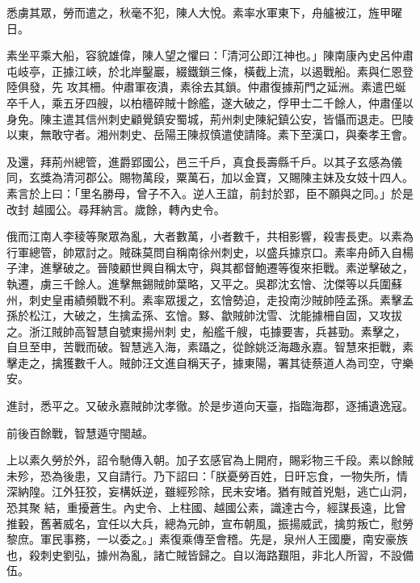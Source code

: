 \begin{pinyinscope}
 悉虜其眾，勞而遣之，秋毫不犯，陳人大悅。素率水軍東下，舟艫被江，旌甲曜日。



 素坐平乘大船，容貌雄偉，陳人望之懼曰：「清河公即江神也。」陳南康內史呂仲肅屯岐亭，正據江峽，於北岸鑿巖，綴鐵鎖三條，橫截上流，以遏戰船。素與仁恩登陸俱發，先
 攻其柵。仲肅軍夜潰，素徐去其鎖。仲肅復據荊門之延洲。素遣巴蜒卒千人，乘五牙四艘，以柏檣碎賊十餘艦，遂大破之，俘甲士二千餘人，仲肅僅以身免。陳主遣其信州刺史顧覺鎮安蜀城，荊州刺史陳紀鎮公安，皆懾而退走。巴陵以東，無敢守者。湘州刺史、岳陽王陳叔慎遣使請降。素下至漢口，與秦孝王會。



 及還，拜荊州總管，進爵郢國公，邑三千戶，真食長壽縣千戶。以其子玄感為儀同，玄獎為清河郡公。賜物萬段，粟萬石，加以金寶，又賜陳主妹及女妓十四人。素言於上曰：「里名勝母，曾子不入。逆人王誼，前封於郢，臣不願與之同。」於是改封
 越國公。尋拜納言。歲餘，轉內史令。



 俄而江南人李稜等聚眾為亂，大者數萬，小者數千，共相影響，殺害長吏。以素為行軍總管，帥眾討之。賊硃莫問自稱南徐州刺史，以盛兵據京口。素率舟師入自楊子津，進擊破之。晉陵顧世興自稱太守，與其都督鮑遷等復來拒戰。素逆擊破之，執遷，虜三千餘人。進擊無錫賊帥葉略，又平之。吳郡沈玄懀、沈傑等以兵圍蘇州，刺史皇甫績頻戰不利。素率眾援之，玄懀勢迫，走投南沙賊帥陸孟孫。素擊孟孫於松江，大破之，生擒孟孫、玄懀。黟、歙賊帥沈雪、沈能據柵自固，又攻拔之。浙江賊帥高智慧自號東揚州刺
 史，船艦千艘，屯據要害，兵甚勁。素擊之，自旦至申，苦戰而破。智慧逃入海，素躡之，從餘姚泛海趣永嘉。智慧來拒戰，素擊走之，擒獲數千人。賊帥汪文進自稱天子，據東陽，署其徒蔡道人為司空，守樂安。



 進討，悉平之。又破永嘉賊帥沈孝徹。於是步道向天臺，指臨海郡，逐捕遺逸寇。



 前後百餘戰，智慧遁守閩越。



 上以素久勞於外，詔令馳傳入朝。加子玄感官為上開府，賜彩物三千段。素以餘賊未殄，恐為後患，又自請行。乃下詔曰：「朕憂勞百姓，日旰忘食，一物失所，情深納隍。江外狂狡，妄構妖逆，雖經殄除，民未安堵。猶有賊首兇魁，逃亡山洞，恐其聚
 結，重擾蒼生。內史令、上柱國、越國公素，識達古今，經謀長遠，比曾推轂，舊著威名，宜任以大兵，總為元帥，宣布朝風，振揚威武，擒剪叛亡，慰勞黎庶。軍民事務，一以委之。」素復乘傳至會稽。先是，泉州人王國慶，南安豪族也，殺刺史劉弘，據州為亂，諸亡賊皆歸之。自以海路艱阻，非北人所習，不設備伍。




\end{pinyinscope}
